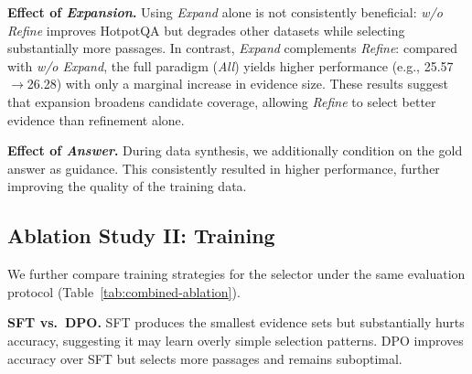 \documentclass[11pt]{article}
\begin{document}
\textbf{Effect of \textit{Expansion}.}
Using \textit{Expand} alone is not consistently beneficial: \emph{w/o Refine} improves HotpotQA  but degrades other datasets while selecting substantially more passages.
In contrast, \textit{Expand} complements \textit{Refine}: compared with \emph{w/o Expand}, the full paradigm (\emph{All}) yields higher performance (e.g., 25.57$\rightarrow$26.28) with only a marginal increase in evidence size.
These results suggest that expansion broadens candidate coverage, allowing \textit{Refine} to select better evidence than refinement alone.


\textbf{Effect of \textit{Answer}.}
During data synthesis, we additionally condition on the gold answer as guidance. This consistently resulted in higher performance, further improving the quality of the training data.




\subsection{Ablation Study II: Training}
We further compare training strategies for the selector under the same evaluation protocol (Table~\ref{tab:combined-ablation}).

\textbf{SFT vs.\ DPO.}
SFT produces the smallest evidence sets but substantially hurts accuracy, suggesting it may learn overly simple selection patterns. 
DPO improves accuracy over SFT but selects more passages and remains suboptimal. 
\end{document}
